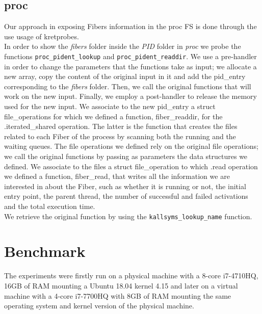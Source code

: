 \documentclass[11pt]{article}
\begin{document}
\subsection{proc}
Our approach in exposing Fibers information in the proc FS is done through the use usage of kretprobes.\\ %
In order to show the \textit{fibers} folder inside the \textit{PID} folder in \textit{proc} we probe the functions \texttt{proc\_pident\_lookup} and \texttt{proc\_pident\_readdir}. We use a pre-handler in order to change the parameters that the functions take as input; we allocate a new array, copy the content of the original input in it and add the pid\_entry corresponding to the \textit{fibers} folder. Then, we call the original functions that will work on the new input. Finally, we employ a post-handler to release the memory used for the new input. We associate to the new pid\_entry a struct file\_operations for which we defined a function, fiber\_readdir, for the .iterated\_shared operation. The latter is the function that creates the files related to each Fiber of the process by scanning both the running and the waiting queues. The file operations we defined rely on the original file operations; we call the original functions by passing as parameters the data structures we defined. We associate to the files a struct file\_operation to which .read operation we defined a function, fiber\_read, that writes all the information we are interested in about the Fiber, such as whether it is running or not, the initial entry point, the parent thread, the number of successful and failed activations and the total execution time.\\
We retrieve the original function by using the \texttt{kallsyms\_lookup\_name} function.

\section{Benchmark}
The experiments were firstly run on a physical machine with a 8-core i7-4710HQ, 16GB of RAM mounting a Ubuntu 18.04 kernel 4.15 and later on a virtual machine with a 4-core i7-7700HQ with 8GB of RAM mounting the same operating system and kernel version of the physical machine.
\end{document}

